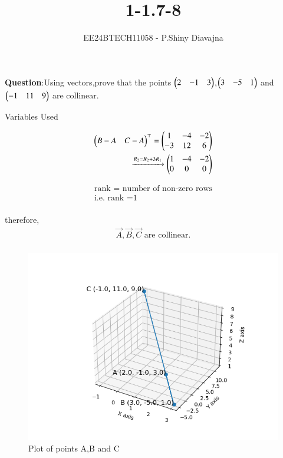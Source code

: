 \documentclass[journal]{IEEEtran}
\begin{document}

\vspace{3cm}

\title{1-1.7-8}
\author{EE24BTECH11058 - P.Shiny Diavajna}
{\let\newpage\relax\maketitle}

\renewcommand{\thefigure}{\theenumi}
\renewcommand{\thetable}{\theenumi}
\setlength{\intextsep}{10pt} %


\renewcommand{\thetable}{\theenumi}


\textbf{Question}:Using vectors,prove that the points $\begin{pmatrix}2 & -1 & 3\end{pmatrix}$,$\begin{pmatrix}3 & -5 & 1\end{pmatrix}$ and $\begin{pmatrix}-1 & 11 & 9\end{pmatrix}$ are collinear. \\

\solution 
\begin{table}[h!]    
  \centering
  
  \caption{Variables Used}
  \label{tab1-1.7-8.1}
\end{table}

  \begin{align*}
	\begin{pmatrix}B-A & C-A\end{pmatrix}^\top =\begin{pmatrix}1 & -4 & -2 \\-3 & 12 &6\end{pmatrix}\\
	\xrightarrow{R_2=R_2+3R_1} \begin{pmatrix}1 & -4 &-2\\ 0 & 0 &0\end{pmatrix}\\ 
  \end{align*} 

  \begin{align*}
	\text{rank = number of non-zero rows}\\
	\text{i.e. rank =1}\\
  \end{align*}
	

therefore,\\ 
\begin{align*}	
	\vec{A}, \vec{B} , \vec{C} \text{ are collinear.}\\
\end{align*}



  \begin{figure}[h!]
   \centering
   \includegraphics[width=0.7\linewidth]{figs/Figure_3.png}
   \caption{Plot of points A,B and C}
  \end{figure}
\end{document}
